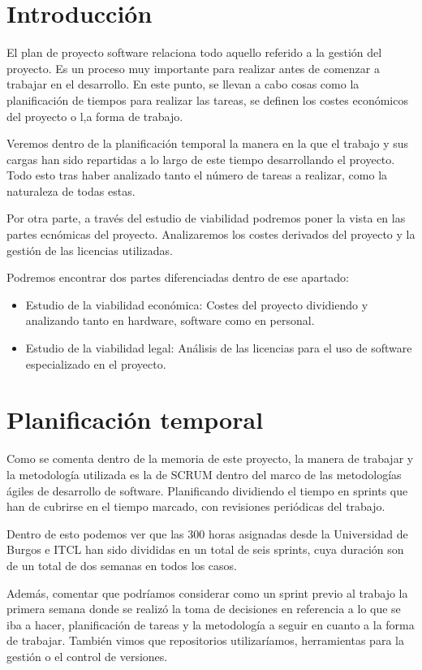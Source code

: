 
\section{Introducción}
El plan de proyecto software relaciona todo aquello referido a la gestión del proyecto. Es un proceso muy importante para realizar antes de comenzar a trabajar en el desarrollo. En este punto, se llevan a cabo cosas como la planificación de tiempos para realizar las tareas, se definen los costes económicos del proyecto o l,a forma de trabajo.

Veremos dentro de la planificación temporal la manera en la que el trabajo y sus cargas han sido repartidas a lo largo de este tiempo desarrollando el proyecto. Todo esto tras haber analizado tanto el número de tareas a realizar, como la naturaleza de todas estas. 

Por otra parte, a través del estudio de viabilidad podremos poner la vista en las partes ecnómicas del proyecto. Analizaremos los costes derivados del proyecto y la gestión de las licencias utilizadas.

Podremos encontrar dos partes diferenciadas dentro de ese apartado:
\begin{itemize}
    \item Estudio de la viabilidad económica: Costes del proyecto dividiendo y analizando tanto en hardware, software como en personal.
    \item Estudio de la viabilidad legal: Análisis de las licencias para el uso de software especializado en el proyecto.
\end{itemize}

\section{Planificación temporal}
Como se comenta dentro de la memoria de este proyecto, la manera de trabajar y la metodología utilizada es la de SCRUM\cite{SCRUM} dentro del marco de las metodologías ágiles de desarrollo de software. Planificando dividiendo el tiempo en sprints que han de cubrirse en el tiempo marcado, con revisiones periódicas del trabajo.

Dentro de esto podemos ver que las 300 horas asignadas desde la Universidad de Burgos e ITCL\cite{itcl} han sido divididas en un total de seis sprints, cuya duración son de un total de dos semanas en todos los casos. 

Además, comentar que podríamos considerar como un sprint previo al trabajo la primera semana donde se realizó la toma de decisiones en referencia a lo que se iba a hacer, planificación de tareas y la metodología a seguir en cuanto a la forma de trabajar. También vimos que repositorios utilizaríamos, herramientas para la gestión o el control de versiones.  
